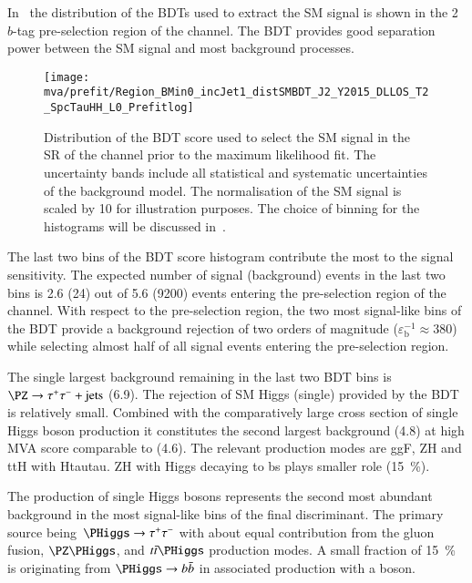 In~ the distribution of the BDTs used to
extract the SM \HH signal is shown in the 2 $b$-tag pre-selection
region of the \hadhad channel. The BDT provides good separation power between the SM \HH
signal and most background processes.

\begin{figure}[htbp]
  \centering

  \texttt{[image: mva/prefit/Region\_BMin0\_incJet1\_distSMBDT\_J2\_Y2015\_DLLOS\_T2\_SpcTauHH\_L0\_Prefitlog]}

  \caption{Distribution of the BDT score used to select the SM \HH
    signal in the SR of the \hadhad channel prior to the maximum
    likelihood fit. The uncertainty bands include all statistical and
    systematic uncertainties of the background model. The
    normalisation of the SM \HH signal is scaled by 10 for
    illustration purposes. The choice of binning for the histograms
    will be discussed in~.}
  \label{fig:mva_smbdt_prefit}
\end{figure}




The last two bins of the BDT score histogram contribute the most to
the signal sensitivity.  The expected number of signal (background)
events in the last two bins is 2.6 (24) out of 5.6 (9200) events
entering the pre-selection region of the \hadhad channel. With respect
to the pre-selection region, the two most signal-like bins of the BDT
provide a background rejection of two orders of magnitude
($\varepsilon_\text{b}^{-1} \approx 380$) while selecting almost half
of all signal events entering the pre-selection region.


The single largest background remaining in the last two BDT bins is
$\PZ \rightarrow \tautau + \text{jets}$ (6.9).  The rejection of SM
Higgs (single) provided by the BDT is relatively small. Combined with
the comparatively large cross section of single Higgs boson production
it constitutes the second largest background (4.8) at high MVA score
comparable to \ttbar (4.6). The relevant production modes are ggF, ZH
and ttH with Htautau. ZH with Higgs decaying to bs plays smaller role
(\SI{15}{\percent}).

The production of single Higgs bosons represents the second most
abundant background in the most signal-like bins of the final
discriminant. The primary source
being~$\PHiggs \rightarrow \tautau$ with about equal contribution from
the gluon fusion, $\PZ\PHiggs$, and $\ttbar\PHiggs$ production
modes. A small fraction of \SI{15}{\percent} is originating from
$\PHiggs \rightarrow \bbbar$ in associated production with a \PZ
boson.

